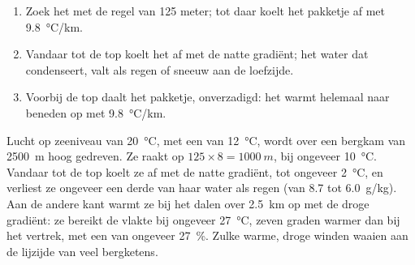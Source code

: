 \begin{method}\label{met:g10:why-clouds-form:mountain}
\begin{enumerate}
  \item Zoek het  met de regel van 125 meter; tot daar koelt
        het pakketje af met \qty{9.8}{\degreeCelsius/km}.
  \item Vandaar tot de top koelt het af met de natte gradiënt; het water dat
        condenseert, valt als regen of sneeuw aan de loefzijde.
  \item Voorbij de top daalt het pakketje, onverzadigd: het warmt helemaal naar
        beneden op met \qty{9.8}{\degreeCelsius/km}.
\end{enumerate}
\end{method}

\begin{example}\label{ex:g10:why-clouds-form:lee}
Lucht op zeeniveau van \qty{20}{\degreeCelsius}, met een  van
\qty{12}{\degreeCelsius}, wordt over een bergkam van \qty{2500}{m} hoog
gedreven. Ze raakt  op $125 \times 8 = \qty{1000}{m}$, bij ongeveer
\qty{10}{\degreeCelsius}. Vandaar tot de top koelt ze af met de natte gradiënt,
tot ongeveer \qty{2}{\degreeCelsius}, en verliest ze ongeveer een derde van haar
water als regen (van \num{8.7} tot \qty{6.0}{g/kg}). Aan de andere kant warmt ze
bij het dalen over \qty{2.5}{km} op met de droge gradiënt: ze bereikt de vlakte
bij ongeveer \qty{27}{\degreeCelsius}, zeven graden warmer dan bij het vertrek,
met een  van ongeveer \qty{27}{\percent}. Zulke warme,
droge winden waaien aan de lijzijde van veel bergketens.
\end{example}

